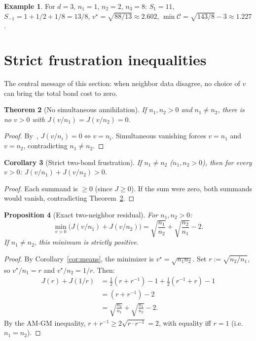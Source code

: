 \documentclass[11pt]{amsart}
\newtheorem{theorem}{Theorem}[section]
\newtheorem{proposition}[theorem]{Proposition}
\newtheorem{corollary}[theorem]{Corollary}
\theoremstyle{definition}
\newtheorem{example}[theorem]{Example}
\theoremstyle{remark}
\begin{document}
\begin{example}
For $d=3$, $n_1=1$, $n_2=2$, $n_3=8$:
$S_1=11$, $S_{-1}=1+1/2+1/8=13/8$,
$v^\star=\sqrt{88/13}\approx 2.602$,
$\min\mathcal C=\sqrt{143/8}-3\approx 1.227$.
\end{example}

\section{Strict frustration inequalities}\label{sec:frustration}

The central message of this section: when neighbor data disagree,
no choice of $v$ can bring the total bond cost to zero.

\begin{theorem}[No simultaneous annihilation]\label{thm:no-simult}
If $n_1,n_2>0$ and $n_1\neq n_2$, there is no $v>0$ with
$J(v/n_1)=J(v/n_2)=0$.
\end{theorem}
\begin{proof}
By~\cite[Corollary~2.5]{F1}, $J(v/n_i)=0\iff v=n_i$.
Simultaneous vanishing forces $v=n_1$ and $v=n_2$, contradicting
$n_1\neq n_2$.
\end{proof}

\begin{corollary}[Strict two-bond frustration]\label{cor:strict-two}
If $n_1\neq n_2$ ($n_1,n_2>0$), then for every $v>0$:
$J(v/n_1)+J(v/n_2)>0$.
\end{corollary}
\begin{proof}
Each summand is $\ge0$ (since $J\ge0$).
If the sum were zero, both summands would vanish,
contradicting Theorem~\ref{thm:no-simult}.
\end{proof}

\begin{proposition}[Exact two-neighbor residual]\label{prop:two-exact}
For $n_1,n_2>0$:
\begin{equation}\label{eq:two-residual}
\min_{v>0}\bigl(J(v/n_1)+J(v/n_2)\bigr)
=\sqrt{\frac{n_1}{n_2}}+\sqrt{\frac{n_2}{n_1}}-2.
\end{equation}
If $n_1\neq n_2$, this minimum is strictly positive.
\end{proposition}
\begin{proof}
By Corollary~\ref{cor:means}, the minimizer is $v^\star=\sqrt{n_1n_2}$.
Set $r:=\sqrt{n_2/n_1}$, so $v^\star/n_1=r$ and $v^\star/n_2=1/r$.
Then:
\begin{align*}
J(r)+J(1/r)
&=\frac12(r+r^{-1})-1+\frac12(r^{-1}+r)-1 \\
&=(r+r^{-1})-2 \\
&=\sqrt{\frac{n_2}{n_1}}+\sqrt{\frac{n_1}{n_2}}-2.
\end{align*}
By the AM-GM inequality, $r+r^{-1}\ge 2\sqrt{r\cdot r^{-1}}=2$,
with equality iff $r=1$ (i.e.\ $n_1=n_2$).
\end{proof}
\end{document}
